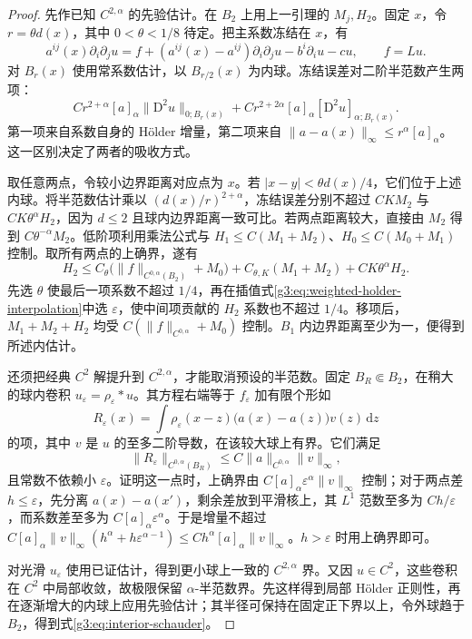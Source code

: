 \begin{proof}
	先作已知 \(C^{2,\alpha}\) 的先验估计。在 \(B_2\) 上用上一引理的 \(M_j,H_2\)。固定 \(x\)，令 \(r=\theta d(x)\)，其中 \(0<\theta<1/8\) 待定。把主系数冻结在 \(x\)，有
	\[
		a^{ij}(x)\partial_i\partial_j u
		=f+(a^{ij}(x)-a^{ij})\partial_i\partial_j u
		-b^i\partial_i u-cu,\qquad f=Lu.
	\]
	对 \(B_r(x)\) 使用常系数估计，以 \(B_{r/2}(x)\) 为内球。冻结误差对二阶半范数产生两项：
	\[
		Cr^{2+\alpha}[a]_\alpha\|\mathrm D^2u\|_{0;B_r(x)}
		+Cr^{2+2\alpha}[a]_\alpha[\mathrm D^2u]_{\alpha;B_r(x)}.
	\]
	第一项来自系数自身的 Hölder 增量，第二项来自 \(\|a-a(x)\|_\infty\le r^\alpha[a]_\alpha\)。这一区别决定了两者的吸收方式。

	取任意两点，令较小边界距离对应点为 \(x\)。若 \(|x-y|<\theta d(x)/4\)，它们位于上述内球。将半范数估计乘以 \((d(x)/r)^{2+\alpha}\)，冻结误差分别不超过 \(CKM_2\) 与 \(CK\theta^\alpha H_2\)，因为 \(d\le2\) 且球内边界距离一致可比。若两点距离较大，直接由 \(M_2\) 得到 \(C\theta^{-\alpha}M_2\)。低阶项利用乘法公式与 \(H_1\le C(M_1+M_2)\)、\(H_0\le C(M_0+M_1)\) 控制。取所有两点的上确界，遂有
	\[
		H_2\le C_\theta\bigl(\|f\|_{C^{0,\alpha}(B_2)}+M_0\bigr)
		+C_{\theta,K}(M_1+M_2)+CK\theta^\alpha H_2.
	\]
	先选 \(\theta\) 使最后一项系数不超过 \(1/4\)，再在插值式\eqref{g3:eq:weighted-holder-interpolation}中选 \(\varepsilon\)，使中间项贡献的 \(H_2\) 系数也不超过 \(1/4\)。移项后，\(M_1+M_2+H_2\) 均受 \(C(\|f\|_{C^{0,\alpha}}+M_0)\) 控制。\(B_1\) 内边界距离至少为一，便得到所述内估计。

	还须把经典 \(C^2\) 解提升到 \(C^{2,\alpha}\)，才能取消预设的半范数。固定 \(B_R\Subset B_2\)，在稍大的球内卷积 \(u_\varepsilon=\rho_\varepsilon*u\)。其方程右端等于 \(f_\varepsilon\) 加有限个形如
	\[
		R_\varepsilon(x)=\int\rho_\varepsilon(x-z)
		\bigl(a(x)-a(z)\bigr)v(z)\,\mathrm dz
	\]
	的项，其中 \(v\) 是 \(u\) 的至多二阶导数，在该较大球上有界。它们满足
	\begin{equation}\label{g3:eq:holder-mollifier-commutator}
		\|R_\varepsilon\|_{C^{0,\alpha}(B_R)}
		\le C\|a\|_{C^{0,\alpha}}\|v\|_\infty,
	\end{equation}
	且常数不依赖小 \(\varepsilon\)。证明这一点时，上确界由 \(C[a]_\alpha\varepsilon^\alpha\|v\|_\infty\) 控制；对于两点差 \(h\le\varepsilon\)，先分离 \(a(x)-a(x')\)，剩余差放到平滑核上，其 \(L^1\) 范数至多为 \(Ch/\varepsilon\)，而系数差至多为 \(C[a]_\alpha\varepsilon^\alpha\)。于是增量不超过 \(C[a]_\alpha\|v\|_\infty(h^\alpha+h\varepsilon^{\alpha-1})\le Ch^\alpha[a]_\alpha\|v\|_\infty\)。\(h>\varepsilon\) 时用上确界即可。

	对光滑 \(u_\varepsilon\) 使用已证估计，得到更小球上一致的 \(C^{2,\alpha}\) 界。又因 \(u\in C^2\)，这些卷积在 \(C^2\) 中局部收敛，故极限保留 \(\alpha\)-半范数界。先这样得到局部 Hölder 正则性，再在逐渐增大的内球上应用先验估计；其半径可保持在固定正下界以上，令外球趋于 \(B_2\)，得到式\eqref{g3:eq:interior-schauder}。
\end{proof}

